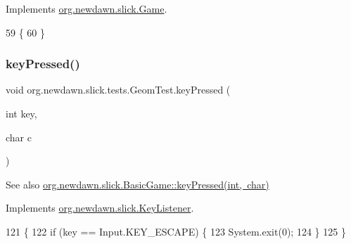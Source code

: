 Implements \mbox{\hyperlink{interfaceorg_1_1newdawn_1_1slick_1_1_game_ad2dd6affab08bb8fdb5fab0815957b7a}{org.\+newdawn.\+slick.\+Game}}.


\begin{DoxyCode}
59                                                                     \{
60     \}
\end{DoxyCode}
\mbox{\label{classorg_1_1newdawn_1_1slick_1_1tests_1_1_geom_test_a642a873782025487f7553ddb7e77eca1}} 
\subsubsection{\texorpdfstring{key\+Pressed()}{keyPressed()}}
{\footnotesize\ttfamily void org.\+newdawn.\+slick.\+tests.\+Geom\+Test.\+key\+Pressed (\begin{DoxyParamCaption}\item[{int}]{key,  }\item[{char}]{c }\end{DoxyParamCaption})\hspace{0.3cm}{\ttfamily [inline]}}

\begin{DoxySeeAlso}{See also}
\mbox{\hyperlink{classorg_1_1newdawn_1_1slick_1_1_basic_game_a4fbb3345b5abf5ddd54a99466d07f02f}{org.\+newdawn.\+slick.\+Basic\+Game\+::key\+Pressed(int, char)}} 
\end{DoxySeeAlso}


Implements \mbox{\hyperlink{interfaceorg_1_1newdawn_1_1slick_1_1_key_listener_ac0b0568a21ef486c4f51382614c196ef}{org.\+newdawn.\+slick.\+Key\+Listener}}.


\begin{DoxyCode}
121                                             \{
122         \textcolor{keywordflow}{if} (key == Input.KEY\_ESCAPE) \{
123             System.exit(0);
124         \}
125     \}
\end{DoxyCode}
\mbox{\label{classorg_1_1newdawn_1_1slick_1_1tests_1_1_geom_test_a5978e27fffbc552a4f868521384d158c}} 
